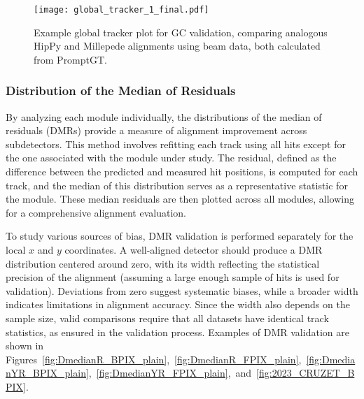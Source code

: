 \begin{figure}[!hbt]
    \begin{center}
        \texttt{[image: global\_tracker\_1\_final.pdf]}
        \caption{Example global tracker plot for GC validation, comparing analogous HipPy and Millepede alignments using beam data, both calculated from PromptGT.}
        \label{fig:global_tracker_1_final}
    \end{center}
\end{figure}

\subsubsection{Distribution of the Median of Residuals}

By analyzing each module individually, the distributions of the median of residuals (DMRs) provide a measure of alignment improvement across subdetectors. This method involves refitting each track using all hits except for the one associated with the module under study. The residual, defined as the difference between the predicted and measured hit positions, is computed for each track, and the median of this distribution serves as a representative statistic for the module. These median residuals are then plotted across all modules, allowing for a comprehensive alignment evaluation.

To study various sources of bias, DMR validation is performed separately for the local \( x \) and \( y \) coordinates. A well-aligned detector should produce a DMR distribution centered around zero, with its width reflecting the statistical precision of the alignment (assuming a large enough sample of hits is used for validation). Deviations from zero suggest systematic biases, while a broader width indicates limitations in alignment accuracy. Since the width also depends on the sample size, valid comparisons require that all datasets have identical track statistics, as ensured in the validation process. Examples of DMR validation are shown in Figures~\ref{fig:DmedianR_BPIX_plain},~\ref{fig:DmedianR_FPIX_plain},~\ref{fig:DmedianYR_BPIX_plain},~\ref{fig:DmedianYR_FPIX_plain},~and~\ref{fig:2023_CRUZET_BPIX}.

